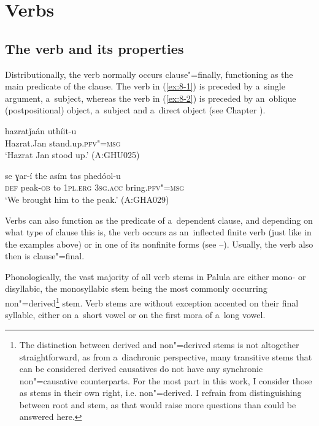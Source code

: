\chapter{Verbs}
\label{chap:8}

\section{The verb and its properties}
\label{sec:8-1}



Distributionally, the verb normally occurs clause"=finally, functioning as the main predicate of the clause. The verb in (\ref{ex:8-1}) is preceded by a~single argument, a~subject, whereas the verb in (\ref{ex:8-2}) is preceded by an~oblique (postpositional) object, a~subject and a~direct object (see Chapter ).

\begin{exe}
\ex
\label{ex:8-1}
\gll hazratǰaán uthíit-u \\
Hazrat.Jan stand.up.\textsc{pfv"=msg} \\
\glt `Hazrat Jan stood up.' (A:GHU025)
\end{exe}
\begin{exe}
\ex
\label{ex:8-2}
\gll se ɣar-í the asím tas phedóol-u \\
\textsc{def} peak-\textsc{ob} to \textsc{1pl.erg} \textsc{3sg.acc} bring.\textsc{pfv"=msg} \\
\glt `We brought him to the peak.' (A:GHA029)
\end{exe}

Verbs can also function as the predicate of a~dependent clause, and depending on what type of clause this is, the verb occurs as an~inflected finite verb (just like in the examples above) or in one of its nonfinite forms (see --). Usually, the verb also then is clause"=final.


Phonologically, the vast majority of all verb stems in Palula are either mono- or disyllabic, the monosyllabic stem being the most commonly occurring non"=derived\footnote{The distinction between derived and non"=derived stems is not altogether straightforward, as from a~diachronic perspective, many transitive stems that can be considered derived causatives do not have any synchronic non"=causative counterparts. For the most part in this work, I consider those as stems in their own right, i.e. non"=derived. I refrain from distinguishing between root and stem, as that would raise more questions than could be answered here.} stem. Verb stems are without exception accented on their final syllable, either on a~short vowel or on the first mora of a~long vowel. 


